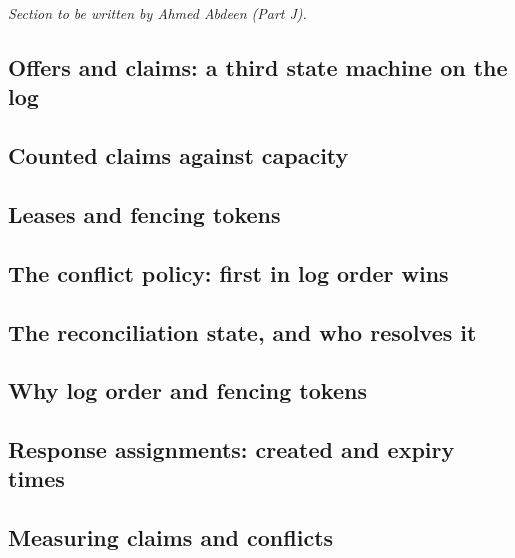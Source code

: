 
\tbd{} \emph{Section to be written by Ahmed Abdeen (Part J).}

\subsection{Offers and claims: a third state machine on the log}

\subsection{Counted claims against capacity}

\subsection{Leases and fencing tokens}

\subsection{The conflict policy: first in log order wins}

\subsection{The reconciliation state, and who resolves it}

\subsection{Why log order and fencing tokens}

\subsection{Response assignments: created and expiry times}

\subsection{Measuring claims and conflicts}
